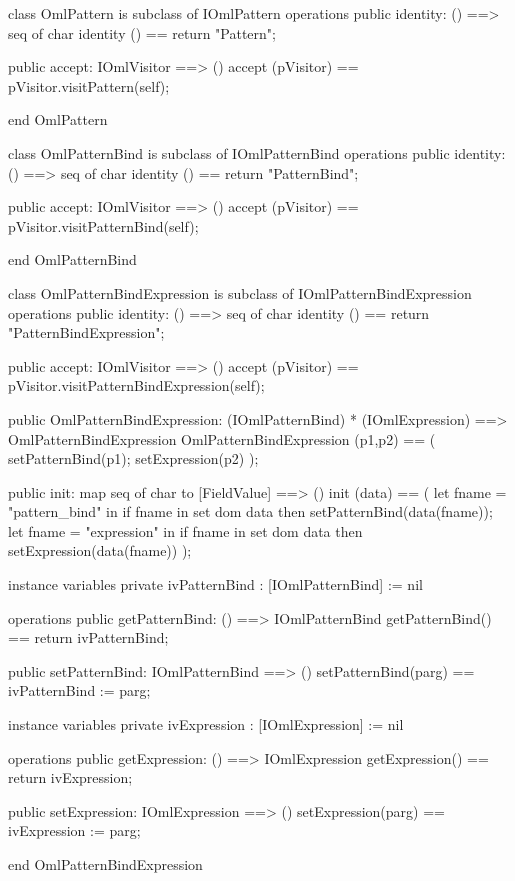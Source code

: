 \begin{vdm_al}
class OmlPattern is subclass of IOmlPattern
operations
  public identity: () ==> seq of char
  identity () == return "Pattern";

  public accept: IOmlVisitor ==> ()
  accept (pVisitor) == pVisitor.visitPattern(self);

end OmlPattern
\end{vdm_al}
\begin{vdm_al}
class OmlPatternBind is subclass of IOmlPatternBind
operations
  public identity: () ==> seq of char
  identity () == return "PatternBind";

  public accept: IOmlVisitor ==> ()
  accept (pVisitor) == pVisitor.visitPatternBind(self);

end OmlPatternBind
\end{vdm_al}
\begin{vdm_al}
class OmlPatternBindExpression is subclass of IOmlPatternBindExpression
operations
  public identity: () ==> seq of char
  identity () == return "PatternBindExpression";

  public accept: IOmlVisitor ==> ()
  accept (pVisitor) == pVisitor.visitPatternBindExpression(self);

  public OmlPatternBindExpression:
      (IOmlPatternBind) *
      (IOmlExpression) ==> OmlPatternBindExpression
  OmlPatternBindExpression (p1,p2) == 
   ( setPatternBind(p1);
     setExpression(p2) );

  public init: map seq of char to [FieldValue] ==> ()
  init (data) ==
    ( let fname = "pattern_bind" in
        if fname in set dom data
        then setPatternBind(data(fname));
      let fname = "expression" in
        if fname in set dom data
        then setExpression(data(fname)) );

instance variables
  private ivPatternBind : [IOmlPatternBind] := nil

operations
  public getPatternBind: () ==> IOmlPatternBind
  getPatternBind() == return ivPatternBind;

  public setPatternBind: IOmlPatternBind ==> ()
  setPatternBind(parg) == ivPatternBind := parg;

instance variables
  private ivExpression : [IOmlExpression] := nil

operations
  public getExpression: () ==> IOmlExpression
  getExpression() == return ivExpression;

  public setExpression: IOmlExpression ==> ()
  setExpression(parg) == ivExpression := parg;

end OmlPatternBindExpression
\end{vdm_al}

